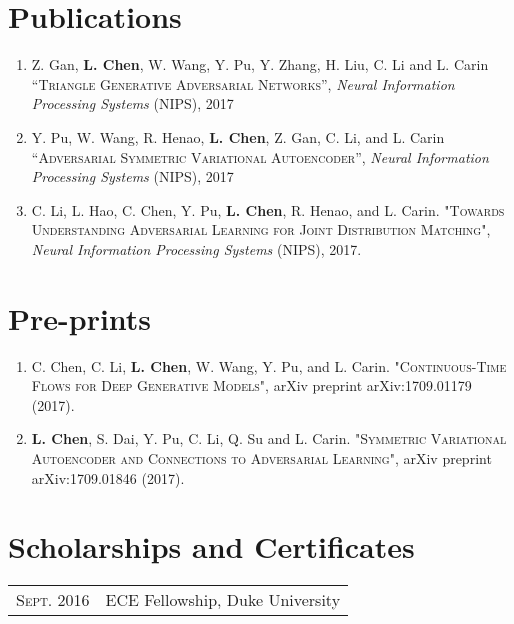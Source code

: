 \documentclass[a4paper,10pt]{article}
\begin{document}
\section{Publications}
\begin{enumerate}
    \item Z. Gan, \textbf{L. Chen}, W. Wang, Y. Pu, Y. Zhang, H. Liu, C. Li and L. Carin \textsc{“Triangle Generative
Adversarial Networks”}, \textsl{Neural Information Processing Systems} (NIPS), 2017

    \item Y. Pu, W. Wang, R. Henao, \textbf{L. Chen}, Z. Gan, C. Li, and L. Carin \textsc{“Adversarial Symmetric Variational Autoencoder”}, \textsl{Neural Information Processing Systems} (NIPS), 2017
    
    \item C. Li, L. Hao, C. Chen, Y. Pu, \textbf{L. Chen}, R. Henao, and L. Carin. \textsc{"Towards Understanding Adversarial Learning for Joint Distribution Matching"}, \textsl{Neural Information Processing Systems} (NIPS), 2017.
\end{enumerate}

\section{Pre-prints}
\begin{enumerate}
    \item C. Chen, C. Li, \textbf{L. Chen}, W. Wang, Y. Pu, and L. Carin. \textsc{"Continuous-Time Flows for Deep Generative Models"}, arXiv preprint arXiv:1709.01179 (2017).
    
    \item \textbf{L. Chen}, S. Dai, Y. Pu, C. Li, Q. Su and L. Carin. \textsc{"Symmetric Variational Autoencoder and Connections to Adversarial Learning"}, arXiv preprint arXiv:1709.01846 (2017).
\end{enumerate}

\section{Scholarships and Certificates}
\begin{tabular}{rl}
 \textsc{Sept.} 2016 & ECE Fellowship, Duke University \\

\end{tabular}

\end{document}
